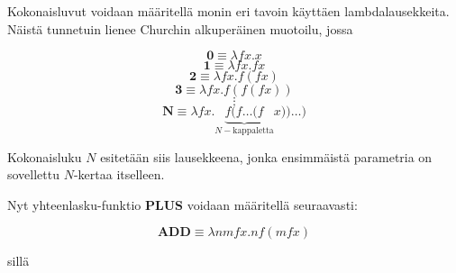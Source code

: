 \begin{esim}
Kokonaisluvut voidaan määritellä monin eri tavoin käyttäen lambdalausekkeita. Näistä tunnetuin lienee Churchin alkuperäinen muotoilu, jossa

\[ \textbf{0} \equiv \lambda fx . x \]
\[ \textbf{1} \equiv \lambda fx . fx \]
\[ \textbf{2} \equiv \lambda fx . f (fx) \] 
\[ \textbf{3} \equiv \lambda fx . f(f(fx)) \]
\[ \vdots \]
\[ \textbf{N} \equiv \lambda fx . \underbrace{ f ( f \ldots (f }_{ N-\text{kappaletta}} x)) \ldots ) \]
 
Kokonaisluku $N$ esitetään siis lausekkeena, jonka ensimmäistä parametria on sovellettu $N$-kertaa itselleen.

\par

Nyt yhteenlasku-funktio  \textbf{PLUS} voidaan määritellä seuraavasti:

\[ \textbf{ADD} \equiv \lambda nmfx . n f (m f x) \] 

sillä 



\end{esim}

